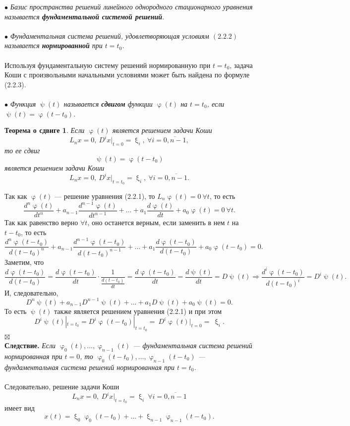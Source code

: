 \documentclass[a4paper, 12pt]{report}
\newenvironment{Proof} %
{\par\noindent{$\blacklozenge$}} %
{\hfill$\scriptstyle\boxtimes$}
\renewcommand{\varphi}{\upvarphi}
\renewcommand{\psi}{\uppsi}
\renewcommand{\xi}{\upxi}
\begin{document}
	$\bullet$ \textit{Базис пространства решений линейного однородного стационарного уравнения называется \textbf{фундаментальной системой решений}}.\\\\
	$\bullet$ \textit{Фундаментальная система решений, удовлетворяющая условиям $(2.2.2)$ называется \textbf{нормированной} при $t = t_0$.}\\\\
	Используя фундаментальную систему решений нормированную при $t=t_0$, задача Коши с произвольными начальными условиями может быть найдена по формуле (2.2.3).\\\\
	$\bullet$ \textit{Функция $\psi(t)$ называется \textbf{сдвигом} функции $\varphi(t)$ на $t=t_0$, если $\psi(t) = \varphi(t-t_0)$.}
	\newtheorem*{2_2_4}{Теорема о сдвиге}\begin{2_2_4}
		Если $\varphi(t)$ является решением задачи Коши $$L_nx = 0,\ D^ix|_{t=0} = \xi_i,\ \forall i = \overline{0,n-1},$$ то ее сдвиг $$\psi(t) = \varphi(t-t_0)$$ является решением задачи Коши  $$L_nx = 0,\ D^ix|_{t=t_0} = \xi_i,\ \forall i = \overline{0,n-1}.$$
	\end{2_2_4}\begin{Proof}
		Так как $\varphi(t)$ --- решение уравнения (2.2.1), то $L_n\varphi(t) = 0\ \forall t$, то есть $$\dfrac{d^n\varphi(t)}{dt^n}+a_{n-1}\dfrac{d^{n-1}\varphi(t)}{dt^{n-1}} + \ldots + a_1\dfrac{d\varphi(t)}{dt} + a_0 \varphi(t) = 0\ \forall t.$$
		Так как равенство верно $\forall t$, оно останется верным, если заменить в нем $t$ на $t-t_0$, то есть
		$$\dfrac{d^n\varphi(t-t_0)}{d(t-t_0)^n}+a_{n-1}\dfrac{d^{n-1}\varphi(t-t_0)}{d(t-t_0)^{n-1}} + \ldots + a_1\dfrac{d\varphi(t-t_0)}{d(t-t_0)} + a_0 \varphi(t-t_0) = 0.$$ Заметим, что $$\dfrac{d\varphi(t-t_0)}{d(t-t_0)} = \dfrac{d\varphi(t-t_0)}{dt} \cdot \dfrac{1}{\frac{d(t-t_0)}{dt}} = \dfrac{d\varphi(t-t_0)}{dt} = \dfrac{d\psi(t)}{dt} = D\psi(t)\Rightarrow\dfrac{d^i\varphi(t-t_0)}{d(t-t_0)^i} = D^i\psi(t).$$ И, следовательно, $$D^n\psi(t) + a_{n-1}D^{n-1}\psi(t) + \ldots + a_1D\psi(t) + a_0\psi(t) = 0.$$ То есть $\psi(t)$ также является решением уравнения (2.2.1) и при этом $$D^i\psi(t)|_{t=t_0} = D^i\varphi(t-t_0)|_{t=t_0} =~D^i\varphi(t)|_{t=0} =~\xi_i.$$\end{Proof}\\
	\textbf{Следствие.} \textit{Если $\varphi_0(t),\ldots,\varphi_{n-1}(t)$ --- фундаментальная система решений нормированная при $t=0$, то $\varphi_0(t-t_0),\ldots,\varphi_{n-1}(t-t_0)$ --- фундаментальная система решений нормированная при $t=t_0$.}\\\\
	Следовательно, решение задачи Коши $$L_nx = 0,\ D^ix|_{t=t_0} = \xi_i\ \forall i = \overline{0,n-1}$$ имеет вид $$x(t) = \xi_0\varphi_0(t-t_0) + \ldots + \xi_{n-1}\varphi_{n-1}(t-t_0).$$
\end{document}
